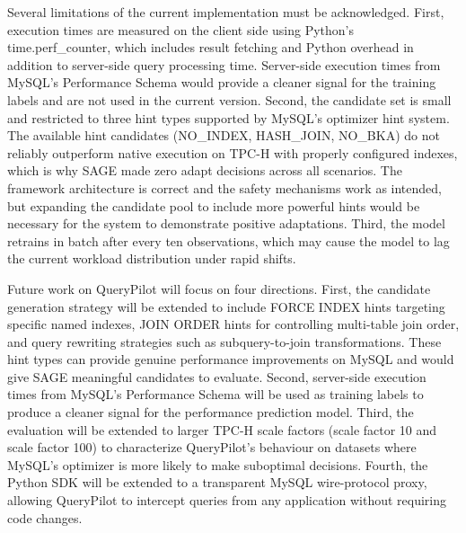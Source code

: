 Several limitations of the current implementation must be acknowledged. First,
execution times are measured on the client side using Python's
time.perf\_counter, which includes result fetching and Python overhead in
addition to server-side query processing time. Server-side execution times
from MySQL's Performance Schema would provide a cleaner signal for the training
labels and are not used in the current version. Second, the candidate set is
small and restricted to three hint types supported by MySQL's optimizer hint
system. The available hint candidates (NO\_INDEX, HASH\_JOIN, NO\_BKA) do not
reliably outperform native execution on TPC-H with properly configured indexes,
which is why SAGE made zero adapt decisions across all scenarios. The
framework architecture is correct and the safety mechanisms work as intended,
but expanding the candidate pool to include more powerful hints would be
necessary for the system to demonstrate positive adaptations. Third, the model
retrains in batch after every ten observations, which may cause the model to
lag the current workload distribution under rapid shifts.

Future work on QueryPilot will focus on four directions. First, the candidate
generation strategy will be extended to include FORCE INDEX hints targeting
specific named indexes, JOIN ORDER hints for controlling multi-table join
order, and query rewriting strategies such as subquery-to-join transformations.
These hint types can provide genuine performance improvements on MySQL and
would give SAGE meaningful candidates to evaluate. Second, server-side
execution times from MySQL's Performance Schema will be used as training labels
to produce a cleaner signal for the performance prediction model. Third, the
evaluation will be extended to larger TPC-H scale factors (scale factor 10 and
scale factor 100) to characterize QueryPilot's behaviour on datasets where
MySQL's optimizer is more likely to make suboptimal decisions. Fourth, the
Python SDK will be extended to a transparent MySQL wire-protocol proxy,
allowing QueryPilot to intercept queries from any application without requiring
code changes.
